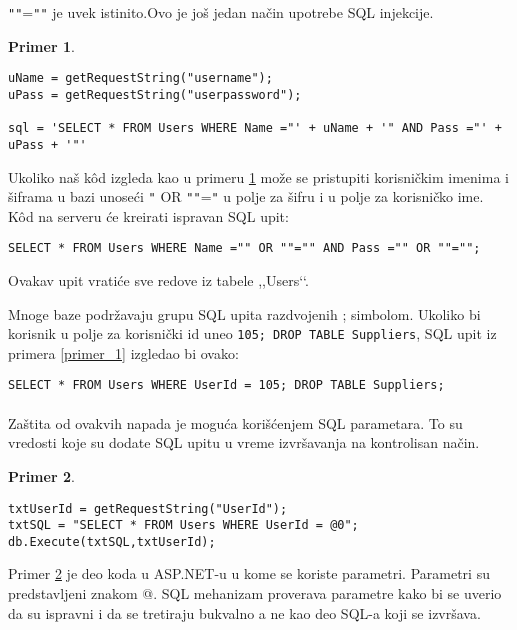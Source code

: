 \documentclass[a4paper]{article}
\theoremstyle{break}
\newtheorem{primer}{Primer}[section]
\begin{document}
{\texttt{"}\texttt{"}=\texttt{"}\texttt{"} je uvek istinito.Ovo je još jedan način upotrebe SQL injekcije.
\begin{primer}
\label{primer_2}
\begin{lstlisting}[frame=single]
uName = getRequestString("username");
uPass = getRequestString("userpassword");

sql = 'SELECT * FROM Users WHERE Name ="' + uName + '" AND Pass ="' + uPass + '"'
\end{lstlisting}
\end{primer}

\noindent Ukoliko naš k\^{o}d izgleda kao u primeru \ref{primer_2} može se pristupiti korisničkim imenima i šiframa u bazi unoseći \texttt{"} OR \texttt{"}\texttt{"}=\texttt{"} u polje za šifru i u polje za korisničko ime. K\^{o}d na serveru će kreirati ispravan SQL upit:

\begin{lstlisting}[frame=single]
SELECT * FROM Users WHERE Name ="" OR ""="" AND Pass ="" OR ""="";
\end{lstlisting}
\noindent Ovakav upit vratiće sve redove iz tabele ,,Users‘‘. 

Mnoge baze podržavaju grupu SQL upita razdvojenih ; simbolom. Ukoliko bi korisnik u polje za korisnički id uneo \texttt{105; DROP TABLE Suppliers}, SQL upit iz primera \ref{primer_1} izgledao bi ovako:

\begin{lstlisting}[frame=single]
SELECT * FROM Users WHERE UserId = 105; DROP TABLE Suppliers; 
\end{lstlisting}
\paragraph{}
Zaštita od ovakvih napada je moguća korišćenjem SQL parametara. To su vredosti koje su dodate SQL upitu u vreme izvršavanja na kontrolisan način.

\begin{primer}
\label{primer_3}
\begin{lstlisting}[frame=single]
txtUserId = getRequestString("UserId");
txtSQL = "SELECT * FROM Users WHERE UserId = @0";
db.Execute(txtSQL,txtUserId);
\end{lstlisting}
\end{primer}
\noindent Primer \ref{primer_3} je deo koda u ASP.NET-u u kome se koriste parametri. Parametri su predstavljeni znakom @. SQL mehanizam proverava parametre kako bi se uverio da su ispravni i da se tretiraju bukvalno a ne kao deo SQL-a koji se izvršava.

}
\end{document}
